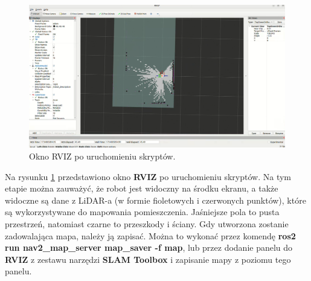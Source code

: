 \documentclass[a4paper,twoside,12pt]{book}
\begin{document}
\begin{figure}[!hb]
	\centering
	\includegraphics[width=1\textwidth]{images/launch-map.png}
	\caption{Okno RVIZ po uruchomieniu skryptów.}
	\label{fig:launch-map}
\end{figure}
Na rysunku \ref{fig:launch-map} przedstawiono okno \textbf{RVIZ} po uruchomieniu skryptów. Na tym etapie można zauważyć, że robot jest widoczny na środku ekranu, a także widoczne są dane z LiDAR-a (w formie fioletowych i czerwonych punktów), które są wykorzystywane do mapowania pomieszczenia. Jaśniejsze pola to pusta przestrzeń, natomiast czarne to przeszkody i ściany. 
\newpage
Gdy utworzona zostanie zadowalająca mapa, należy ją zapisać. Można to wykonać przez komendę \textbf{ros2 run nav2\_map\_server map\_saver -f map}, lub przez dodanie panelu do \textbf{RVIZ} z zestawu narzędzi \textbf{SLAM Toolbox} i zapisanie mapy z poziomu tego panelu.
\end{document}
